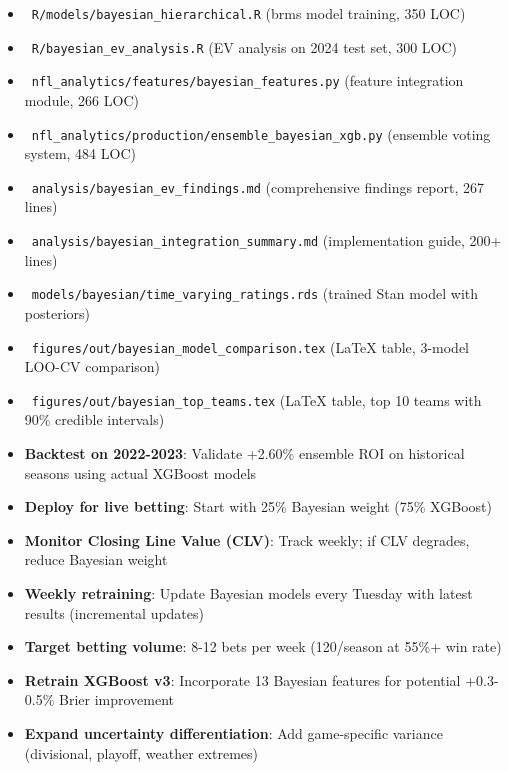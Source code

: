 \begin{itemize}
  \item \done\ \texttt{R/models/bayesian\_hierarchical.R} (brms model training, 350 LOC)
  \item \done\ \texttt{R/bayesian\_ev\_analysis.R} (EV analysis on 2024 test set, 300 LOC)
  \item \done\ \texttt{nfl\_analytics/features/bayesian\_features.py} (feature integration module, 266 LOC)
  \item \done\ \texttt{nfl\_analytics/production/ensemble\_bayesian\_xgb.py} (ensemble voting system, 484 LOC)
  \item \done\ \texttt{analysis/bayesian\_ev\_findings.md} (comprehensive findings report, 267 lines)
  \item \done\ \texttt{analysis/bayesian\_integration\_summary.md} (implementation guide, 200+ lines)
  \item \done\ \texttt{models/bayesian/time\_varying\_ratings.rds} (trained Stan model with posteriors)
  \item \done\ \texttt{figures/out/bayesian\_model\_comparison.tex} (LaTeX table, 3-model LOO-CV comparison)
  \item \done\ \texttt{figures/out/bayesian\_top\_teams.tex} (LaTeX table, top 10 teams with 90\% credible intervals)
\end{itemize}

\begin{itemize}
  \item {} \textbf{Backtest on 2022-2023}: Validate +2.60\% ensemble ROI on historical seasons using actual XGBoost models
  \item {} \textbf{Deploy for live betting}: Start with 25\% Bayesian weight (75\% XGBoost)
  \item {} \textbf{Monitor Closing Line Value (CLV)}: Track weekly; if CLV degrades, reduce Bayesian weight
  \item {} \textbf{Weekly retraining}: Update Bayesian models every Tuesday with latest results (incremental updates)
  \item {} \textbf{Target betting volume}: 8-12 bets per week (120/season at 55\%+ win rate)
  \item {} \textbf{Retrain XGBoost v3}: Incorporate 13 Bayesian features for potential +0.3-0.5\% Brier improvement
  \item {} \textbf{Expand uncertainty differentiation}: Add game-specific variance (divisional, playoff, weather extremes)
\end{itemize}


